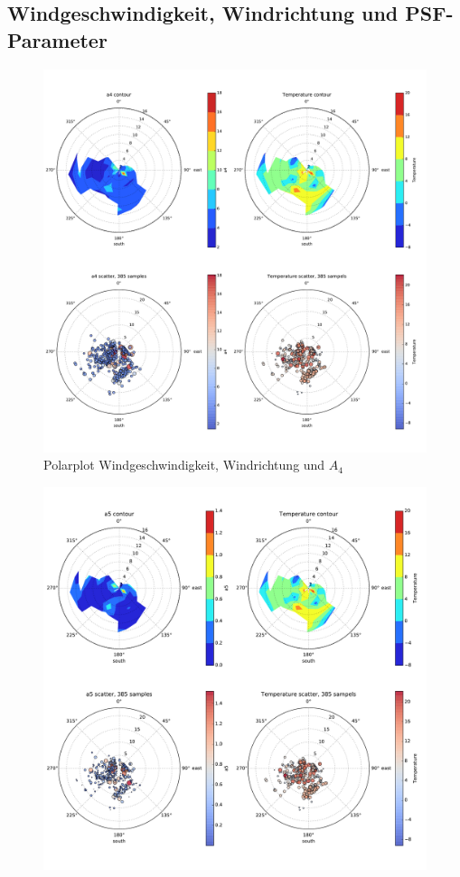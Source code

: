 \begin{appendix}
\section{Windgeschwindigkeit, Windrichtung und PSF-Parameter}
\begin{figure}[H]
	\centering
	\includegraphics[scale=.46]{wind/wind_a4}
	\caption[Polarplot Windgeschwindigkeit, Windrichtung und $A_4$]{Polarplot Windgeschwindigkeit, Windrichtung und $A_4$}
    \label{wind_a4}
\end{figure}
\begin{figure}[H]
	\centering
	\includegraphics[scale=.46]{wind/wind_a5}

\end{figure}
\end{appendix}
